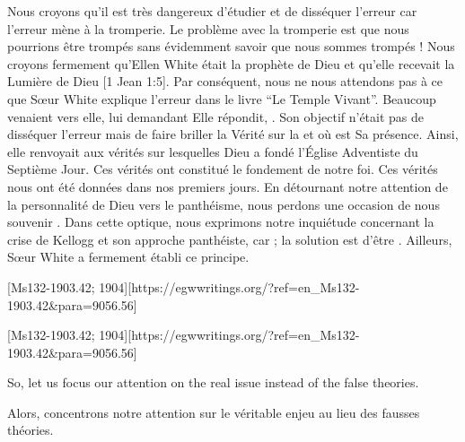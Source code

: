 Nous croyons qu'il est très dangereux d'étudier et de disséquer l'erreur car l'erreur mène à la tromperie. Le problème avec la tromperie est que nous pourrions être trompés sans évidemment savoir que nous sommes trompés ! Nous croyons fermement qu'Ellen White était la prophète de Dieu et qu'elle recevait la Lumière de Dieu [1 Jean 1:5]. Par conséquent, nous ne nous attendons pas à ce que Sœur White explique l'erreur dans le livre “Le Temple Vivant”. Beaucoup venaient vers elle, lui demandant  Elle répondit, . Son objectif n'était pas de disséquer l'erreur mais de faire briller la Vérité sur la  et où est Sa présence. Ainsi, elle renvoyait aux vérités sur lesquelles Dieu a fondé l'Église Adventiste du Septième Jour. Ces vérités ont constitué le fondement de notre foi. Ces vérités nous ont été données dans nos premiers jours. En détournant notre attention de la personnalité de Dieu vers le panthéisme, nous perdons une occasion de nous souvenir . Dans cette optique, nous exprimons notre inquiétude concernant la crise de Kellogg et son approche panthéiste, car  ; la solution est d'être . Ailleurs, Sœur White a fermement établi ce principe.


[Ms132-1903.42; 1904][https://egwwritings.org/?ref=en\_Ms132-1903.42&para=9056.56]


[Ms132-1903.42; 1904][https://egwwritings.org/?ref=en\_Ms132-1903.42&para=9056.56]


So, let us focus our attention on the real issue instead of the false theories.


Alors, concentrons notre attention sur le véritable enjeu au lieu des fausses théories.
